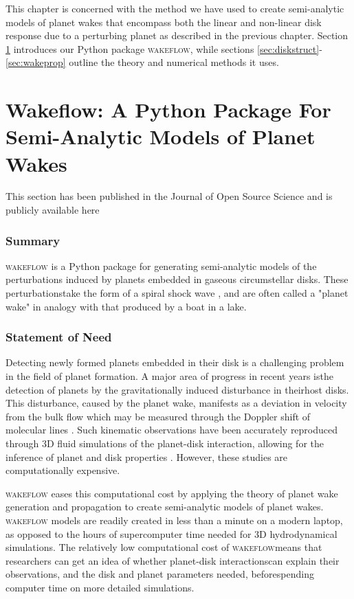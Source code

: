 \setlength{\headheight}{13.59999pt}

This chapter is concerned with the method we have used to create semi-analytic models of planet wakes that encompass both the linear and non-linear disk response due to a perturbing planet as described in the previous chapter. 
Section \ref{sec:JOSS} introduces our Python package \textsc{wakeflow}, while sections \ref{sec:diskstruct}-\ref{sec:wakeprop} outline the theory and numerical methods it uses.

\section{Wakeflow: A Python Package For Semi-Analytic Models of Planet Wakes} \label{sec:JOSS}

This section has been published in the Journal of Open Source Science \fct and is publicly available here \fct

\subsubsection{Summary}

\textsc{wakeflow} is a Python package for generating semi-analytic models of the perturbations induced by planets embedded in gaseous circumstellar disks. 
These perturbationstake the form of a spiral shock wave \citep{ogilvie2002}, and are often called a "planet wake" in analogy with that produced by a boat in a lake.

\subsubsection{Statement of Need}

Detecting newly formed planets embedded in their disk is a challenging problem in the field of planet formation. 
A major area of progress in recent years isthe detection of planets by the gravitationally induced disturbance in theirhost disks. 
This disturbance, caused by the planet wake, manifests as a deviation in velocity from the bulk flow which may be measured through the Doppler shift of molecular lines \citep[eg.][]{perez2015, pinte2018a}. 
Such kinematic observations have been accurately reproduced through 3D fluid simulations of the planet-disk interaction, allowing for the inference of planet and disk properties \citep{pinte2018a, pinte2019}. 
However, these studies are computationally expensive.

\textsc{wakeflow} eases this computational cost by applying the theory of planet wake generation and propagation \citep{goldreich1979,goodman2001,rafikov2002a,bollati2021}to create semi-analytic models of planet wakes. 
\textsc{wakeflow} models are readily created in less than a minute on a modern laptop, as opposed to the hours of supercomputer time needed for 3D hydrodynamical simulations. 
The relatively low computational cost of \textsc{wakeflow}means that researchers can get an idea of whether planet-disk interactionscan explain their observations, and the disk and planet parameters needed, beforespending computer time on more detailed simulations.

